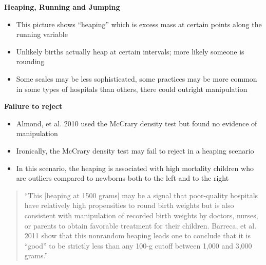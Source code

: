 \documentclass[notes=show]{beamer}
\begin{document}
\begin{frame}[plain]
\begin{center}
\textbf{Heaping, Running and Jumping}
\end{center}

\begin{itemize}
\item This picture shows ``heaping'' which is excess mass at certain points along the running variable
\item Unlikely births actually heap at certain intervals; more likely someone is rounding
\item Some scales may be less sophisticated, some practices may be more common in some types of hospitals than others, there could outright manipulation
\end{itemize}

\end{frame}

\begin{frame}[plain]
\begin{center}
\textbf{Failure to reject}
\end{center}

\begin{itemize}
\item Almond, et al. 2010 used the McCrary density test but found no evidence of manipulation
\item Ironically, the McCrary density test may fail to reject in a heaping scenario
\item In this scenario, the heaping is associated with high mortality children who are outliers compared to newborns both to the left and to the right
\end{itemize}

\end{frame}

\begin{frame}[plain]

\begin{quote}
``This [heaping at 1500 grams] may be a signal that poor-quality hospitals have relatively high propensities to round birth weights but is also consistent with manipulation of recorded birth weights by doctors, nurses, or parents to obtain favorable treatment for their children. Barreca, et al. 2011 show that this nonrandom heaping leads one to conclude that it is ``good'' to be strictly less than any 100-g cutoff between 1,000 and 3,000 grams.''
\end{quote}

\end{frame}
\end{document}
